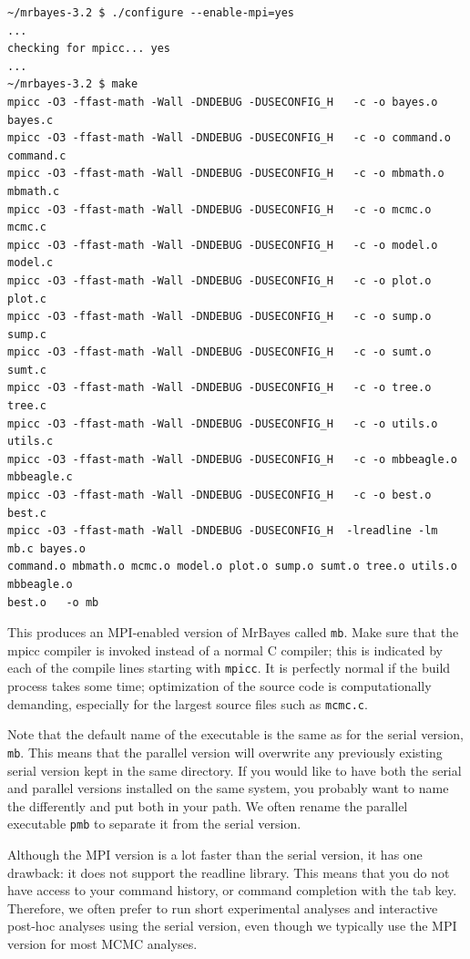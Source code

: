 \documentclass[12pt]{book}
\newcommand{\ttt}[1]{\texttt{#1}}
\begin{document}
\begin{singlespacing}
\scriptsize
\begin{verbatim}
~/mrbayes-3.2 $ ./configure --enable-mpi=yes
...
checking for mpicc... yes
...
~/mrbayes-3.2 $ make
mpicc -O3 -ffast-math -Wall -DNDEBUG -DUSECONFIG_H   -c -o bayes.o bayes.c
mpicc -O3 -ffast-math -Wall -DNDEBUG -DUSECONFIG_H   -c -o command.o command.c
mpicc -O3 -ffast-math -Wall -DNDEBUG -DUSECONFIG_H   -c -o mbmath.o mbmath.c
mpicc -O3 -ffast-math -Wall -DNDEBUG -DUSECONFIG_H   -c -o mcmc.o mcmc.c
mpicc -O3 -ffast-math -Wall -DNDEBUG -DUSECONFIG_H   -c -o model.o model.c
mpicc -O3 -ffast-math -Wall -DNDEBUG -DUSECONFIG_H   -c -o plot.o plot.c
mpicc -O3 -ffast-math -Wall -DNDEBUG -DUSECONFIG_H   -c -o sump.o sump.c
mpicc -O3 -ffast-math -Wall -DNDEBUG -DUSECONFIG_H   -c -o sumt.o sumt.c
mpicc -O3 -ffast-math -Wall -DNDEBUG -DUSECONFIG_H   -c -o tree.o tree.c
mpicc -O3 -ffast-math -Wall -DNDEBUG -DUSECONFIG_H   -c -o utils.o utils.c
mpicc -O3 -ffast-math -Wall -DNDEBUG -DUSECONFIG_H   -c -o mbbeagle.o mbbeagle.c
mpicc -O3 -ffast-math -Wall -DNDEBUG -DUSECONFIG_H   -c -o best.o best.c
mpicc -O3 -ffast-math -Wall -DNDEBUG -DUSECONFIG_H  -lreadline -lm  mb.c bayes.o
command.o mbmath.o mcmc.o model.o plot.o sump.o sumt.o tree.o utils.o mbbeagle.o
best.o   -o mb
\end{verbatim}
\normalsize
\end{singlespacing}

This produces an MPI-enabled version of MrBayes called \ttt{mb}. Make sure that the mpicc compiler
is invoked instead of a normal C compiler; this is indicated by each of the compile lines starting
with \ttt{mpicc}. It is perfectly normal if the build process takes some time; optimization of the
source code is computationally demanding, especially for the largest source files such as
\ttt{mcmc.c}.

Note that the default name of the executable is the same as for the serial version, \ttt{mb}. This
means that the parallel version will overwrite any previously existing serial version kept in the
same directory. If you would like to have both the serial and parallel versions installed on the
same system, you probably want to name the differently and put both in your path. We often rename
the parallel executable \ttt{pmb} to separate it from the serial version.

Although the MPI version is a lot faster than the serial version, it has one drawback: it does not
support the readline library. This means that you do not have access to your command history, or
command completion with the tab key. Therefore, we often prefer to run short experimental analyses
and interactive post-hoc analyses using the serial version, even though we typically use the MPI
version for most MCMC analyses.
\end{document}
